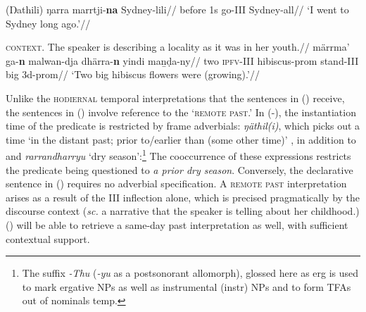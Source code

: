 \a{}\begingl\gla (Ŋathili) ŋarra marrtji-\textbf{na} Sydney-lili//
\glb before 1s go-\gls{III} Sydney-\gls{all}//
\glft`I went to Sydney long ago.'\trailingcitation{[DhG~20190504]}//\endgl

\a{}\begingl\glpreamble\textsc{context.} The speaker is describing a locality as it was in her youth.//
\gla märrma' ga-\textbf{n} malwan-dja dhärra-\textbf{n} yindi maṉḍa-ny//
\glb two \textsc{ipfv}-\gls{III} hibiscus-\gls{prom} stand-\gls{III} big 3d-\gls{prom}//
\glft`Two big hibiscus flowers were (growing).'//\endgl







\xe


Unlike the \textsc{hodiernal} temporal interpretations that the sentences in (\blastx) receive, the sentences in (\lastx) involve reference to the `\textsc{remote past}.' In (-),%
 the instantiation time of the predicate is restricted by frame adverbials: \textit{ŋäthil(i)}, which picks out a time `in the distant past; prior to/earlier than (some other time)' \citep[158]{Wilkinson1991}, in addition to and \textit{rarrandharryu} `dry season':\footnote{The suffix \textit{-Thu} (\textit{-yu} as a postsonorant allomorph), glossed here as \gls{erg} is used to mark ergative NPs as well as instrumental (\gls{instr}) NPs and to form TFAs out of nominals \gls{temp}.} The cooccurrence of these expressions restricts the predicate being questioned to \textit{a prior dry season}. Conversely, the declarative sentence in () requires no adverbial specification. A \textsc{remote past} interpretation arises as a result of the \gls{III} inflection alone, which is precised pragmatically by the discourse context (\textit{sc.} a narrative that the speaker is telling about her childhood.) () will be able to retrieve a same-day past interpretation as well, with sufficient contextual support.

